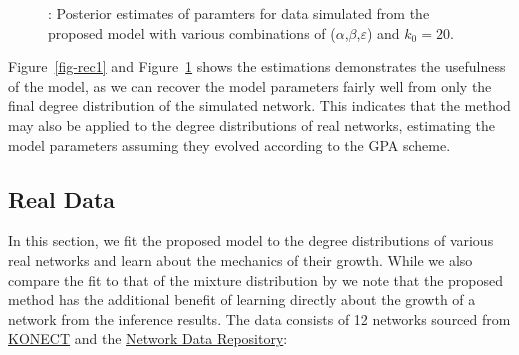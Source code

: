 \documentclass[
  sn-basic,
]{sn-jnl}
\theoremstyle{plain}
\theoremstyle{plain}
\theoremstyle{remark}
\begin{document}
\begin{figure}


\caption{\label{fig-rec2}: Posterior estimates of paramters for data
simulated from the proposed model with various combinations of
(\(\alpha\),\(\beta\),\(\varepsilon\)) and \(k_0=20\).}

\end{figure}%

Figure~\ref{fig-rec1} and Figure~\ref{fig-rec2} shows the estimations
demonstrates the usefulness of the model, as we can recover the model
parameters fairly well from only the final degree distribution of the
simulated network. This indicates that the method may also be applied to
the degree distributions of real networks, estimating the model
parameters assuming they evolved according to the GPA scheme.

\subsection{Real Data}\label{sec-real}

In this section, we fit the proposed model to the degree distributions
of various real networks and learn about the mechanics of their growth.
While we also compare the fit to that of the mixture distribution by
\citet{Lee24} we note that the proposed method has the additional
benefit of learning directly about the growth of a network from the
inference results. The data consists of 12 networks sourced from
\href{konect.cc}{KONECT} and the
\href{https://networkrepository.com}{Network Data Repository}\citep{nr}:
\end{document}
